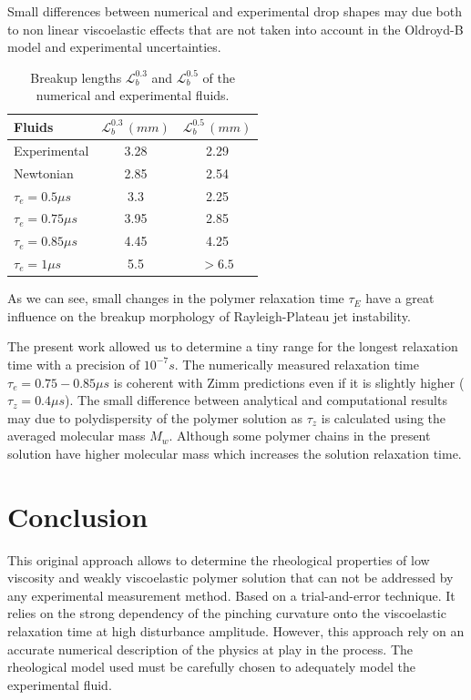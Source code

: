 \documentclass[onecolumn, 12pt]{asme2ej}
\begin{document}
Small differences between numerical and experimental drop shapes may due both to non linear viscoelastic effects that are not taken into account in the Oldroyd-B model and experimental uncertainties.

\begin{table}[H]
    \begin{center}
        \begin{tabular}{l|cc}
            Fluids & $\mathcal{L}^{0.3}_b\,(mm)$ &$\mathcal{L}^{0.5}_b\,(mm)$\\
            \hline
            Experimental  & 3.28  &2.29 \\
            Newtonian & 2.85 & 2.54\\ 
            $\tau_e = 0.5\mu s$ & 3.3 & 2.25\\ 
            $\tau_e = 0.75\mu s$ & 3.95 & 2.85\\ 
            $\tau_e = 0.85\mu s$ & 4.45 & 4.25\\ 
            $\tau_e = 1\mu s$ & 5.5 & $> 6.5$\\ 
            \hline
        \end{tabular}
    \end{center}
    \label{tab:lbInk}
    \caption{Breakup lengths $\mathcal{L}^{0.3}_b$ and $\mathcal{L}^{0.5}_b$ of the numerical and experimental fluids.}
\end{table}


As we can see, small changes in the polymer relaxation time $\tau_E$ have a great influence on the breakup morphology of Rayleigh-Plateau jet instability. 

The present work allowed us to determine a tiny range for the longest relaxation time with a precision of $10^{-7} s$. The numerically measured relaxation time $\tau_e = 0.75-0.85 \mu s$ is coherent with Zimm predictions even if it is slightly higher ($\tau_z = 0.4 \mu s$).  The small difference between analytical and computational results may due to polydispersity of the polymer solution as $\tau_z$ is calculated using the averaged molecular mass $M_w$. Although some polymer chains in the present solution have higher molecular mass which increases the solution relaxation time.

\section{Conclusion}
This original approach allows to determine the rheological properties of low viscosity and weakly viscoelastic polymer solution that can not be addressed by any experimental measurement method. Based on a trial-and-error technique. It relies on the strong dependency of the pinching curvature onto the viscoelastic relaxation time at high disturbance amplitude. However, this approach rely on an accurate numerical description of the physics at play in the process. The rheological model used must be carefully chosen to adequately model the experimental fluid.
\end{document}
